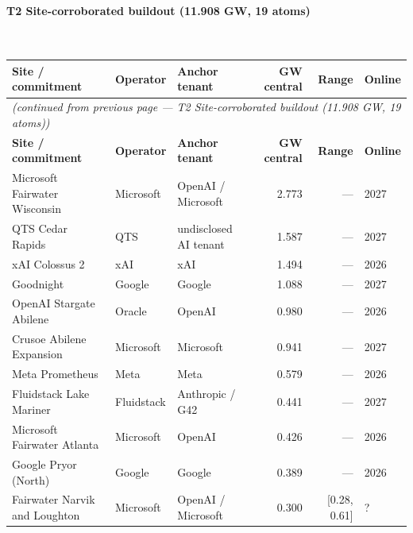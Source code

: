 \paragraph{\textbf{T2 Site-corroborated buildout (11.908 GW, 19 atoms)}}~\\[0.3em]
\noindent\begin{small}
\begin{longtable}{@{}p{4.5cm} p{2.4cm} p{2.4cm} r r p{1.8cm}@{}}
\toprule
\textbf{Site / commitment} & \textbf{Operator} & \textbf{Anchor tenant} & \textbf{GW central} & \textbf{Range} & \textbf{Online} \\
\midrule
\endfirsthead
\multicolumn{6}{l}{\textit{(continued from previous page — T2 Site-corroborated buildout (11.908 GW, 19 atoms))}} \\
\toprule
\textbf{Site / commitment} & \textbf{Operator} & \textbf{Anchor tenant} & \textbf{GW central} & \textbf{Range} & \textbf{Online} \\
\midrule
\endhead
\bottomrule
\endfoot

Microsoft Fairwater Wisconsin & Microsoft & OpenAI / Microsoft & 2.773 & — & 2027 \\

QTS Cedar Rapids & QTS & undisclosed AI tenant & 1.587 & — & 2027 \\

xAI Colossus 2 & xAI & xAI & 1.494 & — & 2026 \\

Goodnight & Google & Google & 1.088 & — & 2027 \\

OpenAI Stargate Abilene & Oracle & OpenAI & 0.980 & — & 2026 \\

Crusoe Abilene Expansion & Microsoft & Microsoft & 0.941 & — & 2027 \\

Meta Prometheus & Meta & Meta & 0.579 & — & 2026 \\

Fluidstack Lake Mariner & Fluidstack & Anthropic / G42 & 0.441 & — & 2027 \\

Microsoft Fairwater Atlanta & Microsoft & OpenAI & 0.426 & — & 2026 \\

Google Pryor (North) & Google & Google & 0.389 & — & 2026 \\

Fairwater Narvik and Loughton & Microsoft & OpenAI / Microsoft & 0.300 & [0.28, 0.61] & ? \\


\end{longtable}
\end{small}
